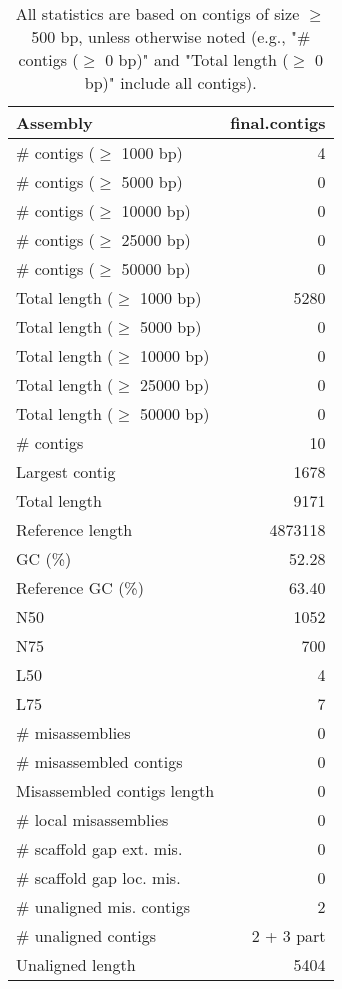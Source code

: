 \documentclass[12pt,a4paper]{article}
\begin{document}
\begin{table}[ht]
\begin{center}
\caption{All statistics are based on contigs of size $\geq$ 500 bp, unless otherwise noted (e.g., "\# contigs ($\geq$ 0 bp)" and "Total length ($\geq$ 0 bp)" include all contigs).}
\begin{tabular}{|l*{1}{|r}|}
\hline
Assembly & final.contigs \\ \hline
\# contigs ($\geq$ 1000 bp) & 4 \\ \hline
\# contigs ($\geq$ 5000 bp) & 0 \\ \hline
\# contigs ($\geq$ 10000 bp) & 0 \\ \hline
\# contigs ($\geq$ 25000 bp) & 0 \\ \hline
\# contigs ($\geq$ 50000 bp) & 0 \\ \hline
Total length ($\geq$ 1000 bp) & 5280 \\ \hline
Total length ($\geq$ 5000 bp) & 0 \\ \hline
Total length ($\geq$ 10000 bp) & 0 \\ \hline
Total length ($\geq$ 25000 bp) & 0 \\ \hline
Total length ($\geq$ 50000 bp) & 0 \\ \hline
\# contigs & 10 \\ \hline
Largest contig & 1678 \\ \hline
Total length & 9171 \\ \hline
Reference length & 4873118 \\ \hline
GC (\%) & 52.28 \\ \hline
Reference GC (\%) & 63.40 \\ \hline
N50 & 1052 \\ \hline
N75 & 700 \\ \hline
L50 & 4 \\ \hline
L75 & 7 \\ \hline
\# misassemblies & 0 \\ \hline
\# misassembled contigs & 0 \\ \hline
Misassembled contigs length & 0 \\ \hline
\# local misassemblies & 0 \\ \hline
\# scaffold gap ext. mis. & 0 \\ \hline
\# scaffold gap loc. mis. & 0 \\ \hline
\# unaligned mis. contigs & 2 \\ \hline
\# unaligned contigs & 2 + 3 part \\ \hline
Unaligned length & 5404 \\ \hline

\end{tabular}
\end{center}
\end{table}
\end{document}
